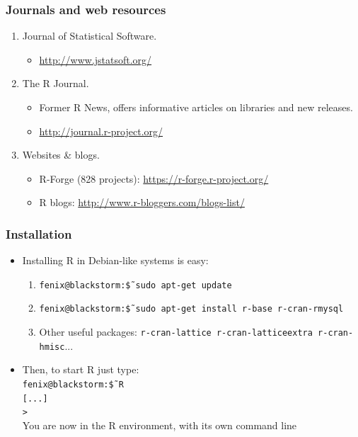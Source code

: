 \documentclass{beamer}
\begin{document}

\begin{frame}

 \frametitle{Journals and web resources}
 \begin{enumerate}

  \item Journal of Statistical Software.
  \begin{itemize}
    \item \url{http://www.jstatsoft.org/}
  \end{itemize}

  \item The R Journal.
    \begin{itemize}
      \item Former R News, offers informative articles on libraries and
      new releases.
      \item \url{http://journal.r-project.org/}
    \end{itemize}

   \item Websites \& blogs.
    \begin{itemize}
      \item R-Forge (828 projects): \url{https://r-forge.r-project.org/}
      \item R blogs: \url{http://www.r-bloggers.com/blogs-list/}
    \end{itemize}

 \end{enumerate}

\end{frame}


\begin{frame}

\frametitle{Installation}
 \begin{itemize}
  \item Installing R in Debian-like systems is easy:
  \begin{enumerate}
   \item \texttt{fenix@blackstorm:\~\$ sudo apt-get update}
   \item \texttt{fenix@blackstorm:\~\$ sudo apt-get install r-base r-cran-rmysql}
   \item Other useful packages: \texttt{r-cran-lattice r-cran-latticeextra r-cran-hmisc}...
  \end{enumerate}
   \item Then, to start R just type:\\
     \texttt{fenix@blackstorm:\~\$ R}\\
     \texttt{[...]}\\
     \texttt{>}\\
    You are now in the R environment, with its own command line
 \end{itemize}

\end{frame}
\end{document}
